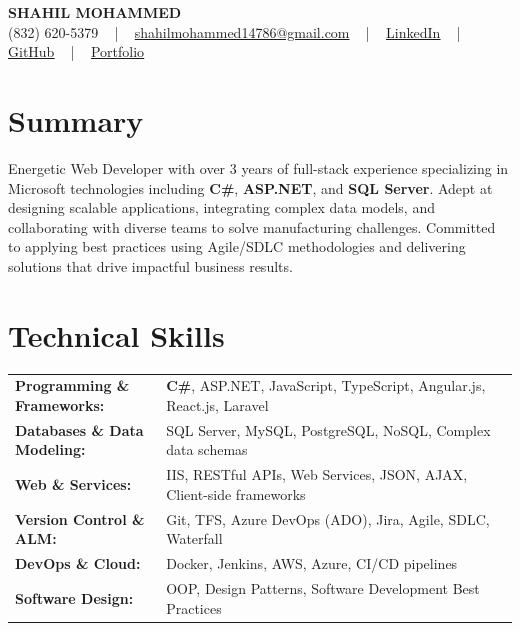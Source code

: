 \documentclass[letterpaper,11pt]{article}
\begin{document}
\begin{center}
    {\fontsize{14pt}{12pt}\selectfont \textbf{\MakeUppercase{Shahil Mohammed}}}\\ \vspace{2pt}
    \fontsize{10pt}{12pt}\selectfont (832) 620-5379 ~ | ~ \href{mailto:shahilmohammed14786@gmail.com}{shahilmohammed14786@gmail.com} ~ | ~  
    \href{https://www.linkedin.com/in/shahil-mohammed-9652931a1/}{\color{blue}\underline{LinkedIn}}  ~ | ~ 
    \href{https://github.com/freakbeast14}{\color{blue}\underline{GitHub}} ~ | ~ 
    \href{https://shahil-mohammed.netlify.app/}{\color{blue}\underline{Portfolio}}
    \vspace{-8pt}
\end{center}

\section{Summary}
\fontsize{9pt}{10pt}\selectfont
Energetic Web Developer with over 3 years of full-stack experience specializing in Microsoft technologies including \textbf{C\#}, \textbf{ASP.NET}, and \textbf{SQL Server}. Adept at designing scalable applications, integrating complex data models, and collaborating with diverse teams to solve manufacturing challenges. Committed to applying best practices using Agile/SDLC methodologies and delivering solutions that drive impactful business results.
 \vspace{-5pt}
 
\section{Technical Skills}
        \vspace{-14pt}
        \begin{table}[h]
            \fontsize{9pt}{10pt}\selectfont
            \begin{tabular}{p{0.3\linewidth} p{0.7\linewidth}}
                \textbf{Programming \& Frameworks:} & \textbf{C\#}, ASP.NET, JavaScript, TypeScript, Angular.js, React.js, Laravel \\
                \textbf{Databases \& Data Modeling:} & SQL Server, MySQL, PostgreSQL, NoSQL, Complex data schemas \\
                \textbf{Web \& Services:} & IIS, RESTful APIs, Web Services, JSON, AJAX, Client-side frameworks \\
                \textbf{Version Control \& ALM:} & Git, TFS, Azure DevOps (ADO), Jira, Agile, SDLC, Waterfall \\
                \textbf{DevOps \& Cloud:} & Docker, Jenkins, AWS, Azure, CI/CD pipelines \\
                \textbf{Software Design:} & OOP, Design Patterns, Software Development Best Practices \\
            \end{tabular}
        \end{table}
 \vspace{-15pt}
 
\end{document}
